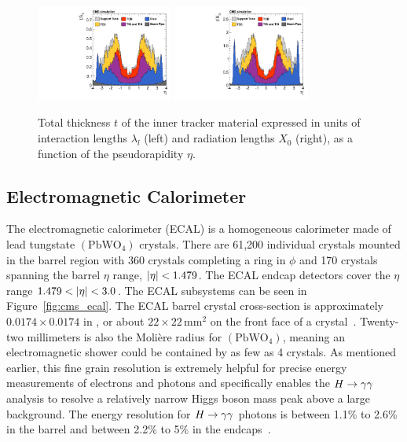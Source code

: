 \begin{figure}[htbp]
\centering
     \includegraphics[width=0.4\textwidth]{cms_and_lhc/plots/cms_tracker_thickness_radiationL.pdf}
     \includegraphics[width=0.4\textwidth]{cms_and_lhc/plots/cms_tracker_thickness_interactionL.pdf}
     \caption{
Total thickness $t$ of the inner tracker material expressed in units of interaction lengths 
$\lambda_{l}$ (left) and radiation lengths $X_{0}$ (right), as a function of the pseudorapidity $\eta$.
     }
     \label{fig:cms_tracker_thickness}
\end{figure}



\subsection{Electromagnetic Calorimeter}
The electromagnetic calorimeter (ECAL) is a homogeneous calorimeter made of lead 
tungstate $(\textrm{PbWO}_{4})$ crystals. There are 61,200 individual crystals mounted
in the barrel region with 360 crystals completing a ring in $\phi$ and 170 crystals
spanning the barrel $\eta$ range, $\lvert\eta\rvert < 1.479$. 
The ECAL endcap detectors cover the $\eta$ range $1.479 < \lvert\eta\rvert < 3.0$. The
ECAL subsystems can be seen in Figure~\ref{fig:cms_ecal}.
The ECAL barrel crystal cross-section is approximately $0.0174 \times 0.0174$ 
in \etaphi, or about $22 \times 22 \, \textrm{mm}^{2}$
on the front face of a crystal~\cite{Chatrchyan:2008zzk}. Twenty-two millimeters is also the Moli\`ere radius
for $(\textrm{PbWO}_{4})$, meaning an electromagnetic shower could be
contained by as few as 4 crystals. As mentioned earlier, this fine grain resolution is extremely
helpful for precise energy measurements of electrons and photons and specifically
enables the $H \to \gamma\gamma$ analysis to resolve a relatively narrow Higgs
boson mass peak above a large background. 
The energy resolution for $H \to \gamma\gamma$ photons is between 1.1\% 
to 2.6\% in the barrel and between 2.2\% to 5\% in the endcaps~\cite{1748-0221-8-09-P09009}.

